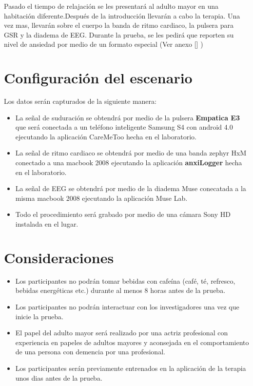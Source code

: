 	Pasado el tiempo de relajaci\'on se les presentar\'a al adulto mayor en una habitaci\'on diferente.Despu\'es de la introducci\'on llevar\'an a cabo la terapia. Una vez mas, llevar\'an sobre el cuerpo la banda de ritmo cardiaco, la pulsera para GSR y la diadema de EEG. Durante la prueba, se les pedir\'a que reporten su nivel de ansiedad por medio de un formato especial (Ver anexo [] )

\section{Configuraci\'on del escenario}
	
	Los datos ser\'an capturados de la siguiente manera:
	\begin{itemize}
		\item{La se\~nal de suduraci\'on se obtendr\'a por medio de la pulsera \textbf{Empatica E3} que ser\'a conectada a un tel\'efono inteligente Samsung S4 con android 4.0 ejecutando la aplicaci\'on CareMeToo hecha en el laboratorio.}
		\item{La se\~nal de ritmo cardiaco se obtendr\'a por medio de una banda zephyr HxM conectado a una macbook 2008 ejecutando la aplicaci\'on \textbf{anxiLogger} hecha en el laboratorio.}
		\item{La se\~nal de EEG se obtendr\'a por medio de la diadema Muse conecatada a la misma macbook 2008 ejecutando la aplicaci\'on Muse Lab.}
		\item{Todo el procedimiento ser\'a grabado por medio de una c\'amara Sony HD instalada en el lugar.}
	\end{itemize}
\section{Consideraciones}
	\begin{itemize}
		\item{Los participantes no podr\'an tomar bebidas con cafe\'ina (caf\'e, t\'e, refresco, bebidas energ\'eticas etc.) durante al menos 8 horas antes de la prueba.}
		\item{Los participantes no podr\'an interactuar con los investigadores una vez que inicie la prueba.}
		\item{El papel del adulto mayor ser\'a realizado por una actriz profesional con experiencia en papeles de adultos mayores y aconsejada en el comportamiento de una persona con demencia por una profesional.}
		\item{Los participantes ser\'an previamente entrenados en la aplicaci\'on de la terapia unos dias antes de la prueba.}
	\end{itemize}
